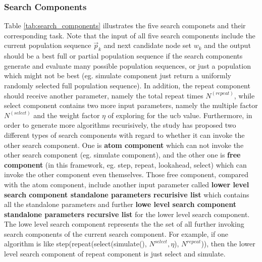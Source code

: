 \documentclass{article}
\begin{document}
\subsubsection{Search Components}
Table \ref{tab:search_components} illustrates the five search componets and their corresponding task. Note that the input of all five search components include the current population sequence $\vec p_{k}$ and next candidate node set $w_{k}$ and the output should be a best full or partial population sequence if the search components generate and evaluate many possible population sequences, or just a population which might not be best (eg. simulate component just return a uniformly randomly selected full population sequence). In addition, the repeat component should receive another parameter, namely the total repeat times $N^{(repeat)}$, while select component contains two more input parameters, namely the multiple factor $N^{(select)}$ and the weight factor $\eta$ of exploring for the ucb value. Furthermore, in order to generate more algorithms recurisively, the study has proposed two different types of search components with regard to whether it can invoke the other search component. One is \textbf{atom component} which can not invoke the other search component (eg. simulate component), and the other one is \textbf{free component} (in this framework, eg. step, repeat, lookahead, select) which can invoke the other component even themselves. Those free component, compared with the atom component, include another input parameter called \textbf{lower level search component standalone parameters recurisive list} which contains all the standalone parameters and further \textbf{lowe level search component standalone parameters recursive list} for the lower level search component. The lowe level search component represents the the set of all further invoking search components of the current search component. For example, if one algorithm is like step(repeat(select(simulate(), $N^{select}, \eta$), $N^{repeat}$)), then the lower level search component of repeat component is just select and simulate. \\
\end{document}
